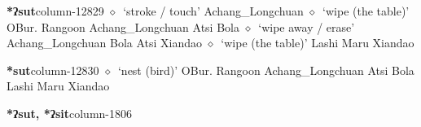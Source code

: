   \item {\footnotesize \textbf{*ʔsut}}{\tiny column-12829}
         $\diamond$~`stroke / touch'
         Achang\_Longchuan 
\hspace{1ex}
         $\diamond$~`wipe (the table)'
         OBur. 
\hspace{1ex}
         Rangoon 
\hspace{1ex}
         Achang\_Longchuan 
\hspace{1ex}
         Atsi 
\hspace{1ex}
         Bola 
\hspace{1ex}
         $\diamond$~`wipe away / erase'
         Achang\_Longchuan 
\hspace{1ex}
         Bola 
\hspace{1ex}
         Atsi 
\hspace{1ex}
         Xiandao 
\hspace{1ex}
         $\diamond$~`wipe (the table)'
         Lashi 
\hspace{1ex}
         Maru 
\hspace{1ex}
         Xiandao 
  \item {\footnotesize \textbf{*sut}}{\tiny column-12830}
         $\diamond$~`nest (bird)'
         OBur. 
\hspace{1ex}
         Rangoon 
\hspace{1ex}
         Achang\_Longchuan 
\hspace{1ex}
         Atsi 
\hspace{1ex}
         Bola 
\hspace{1ex}
         Lashi 
\hspace{1ex}
         Maru 
\hspace{1ex}
         Xiandao 
  \item {\footnotesize \textbf{*ʔsut, *ʔsit}}{\tiny column-1806}
